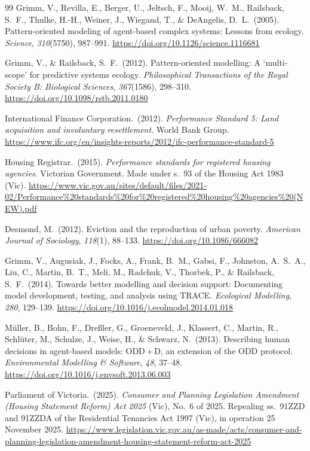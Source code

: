 \documentclass[10pt,a4paper]{article}
\begin{document}
\begin{thebibliography}{99}
Grimm, V., Revilla, E., Berger, U., Jeltsch, F., Mooij, W.\ M., Railsback, S.\ F., Thulke, H.-H., Weiner, J., Wiegand, T., \& DeAngelis, D.\ L.\ (2005). Pattern-oriented modeling of agent-based complex systems: Lessons from ecology.
\textit{Science}, \textit{310}(5750), 987--991.
\url{https://doi.org/10.1126/science.1116681}

Grimm, V., \& Railsback, S.\ F.\ (2012). Pattern-oriented modelling: A `multi-scope' for predictive systems ecology.
\textit{Philosophical Transactions of the Royal Society B: Biological Sciences}, \textit{367}(1586), 298--310.
\url{https://doi.org/10.1098/rstb.2011.0180}

International Finance Corporation.\ (2012). \textit{Performance Standard 5: Land acquisition and involuntary resettlement}. World Bank Group.
\url{https://www.ifc.org/en/insights-reports/2012/ifc-performance-standard-5}

Housing Registrar.\ (2015). \textit{Performance standards for registered housing agencies}. Victorian Government. Made under s.\ 93 of the Housing Act 1983 (Vic).
\url{https://www.vic.gov.au/sites/default/files/2021-02/Performance\%20standards\%20for\%20registered\%20housing\%20agencies\%20(NEW).pdf}

Desmond, M.\ (2012). Eviction and the reproduction of urban poverty.
\textit{American Journal of Sociology}, \textit{118}(1), 88--133.
\url{https://doi.org/10.1086/666082}

Grimm, V., Augusiak, J., Focks, A., Frank, B.\ M., Gabsi, F., Johnston, A.\ S.\ A., Liu, C., Martin, B.\ T., Meli, M., Radchuk, V., Thorbek, P., \& Railsback, S.\ F.\ (2014). Towards better modelling and decision support: Documenting model development, testing, and analysis using TRACE.
\textit{Ecological Modelling}, \textit{280}, 129--139.
\url{https://doi.org/10.1016/j.ecolmodel.2014.01.018}

M\"uller, B., Bohn, F., Dre\ss ler, G., Groeneveld, J., Klassert, C., Martin, R., Schl\"uter, M., Schulze, J., Weise, H., \& Schwarz, N.\ (2013). Describing human decisions in agent-based models: ODD\,+\,D, an extension of the ODD protocol.
\textit{Environmental Modelling \& Software}, \textit{48}, 37--48.
\url{https://doi.org/10.1016/j.envsoft.2013.06.003}

Parliament of Victoria.\ (2025). \textit{Consumer and Planning Legislation Amendment (Housing Statement Reform) Act 2025} (Vic), No.\ 6 of 2025. Repealing ss.\ 91ZZD and 91ZZDA of the Residential Tenancies Act 1997 (Vic), in operation 25 November 2025.
\url{https://www.legislation.vic.gov.au/as-made/acts/consumer-and-planning-legislation-amendment-housing-statement-reform-act-2025}

\end{thebibliography}
\endgroup
\end{document}
